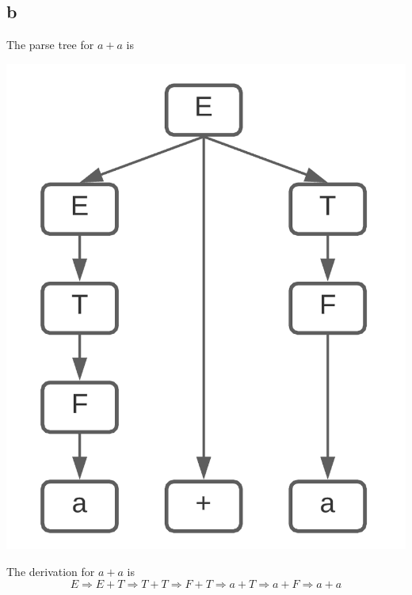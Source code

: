 \documentclass{article}
\begin{document}
\pagebreak

\subsection*{b}
The parse tree for $a+a$ is
\begin{center}
    \includegraphics[scale=.65]{2.1.b.png}
\end{center}
The derivation for $a+a$ is
$$E \Rightarrow E+T \Rightarrow T+T \Rightarrow F+T \Rightarrow a + T \Rightarrow a + F \Rightarrow a + a$$

\pagebreak
\end{document}
